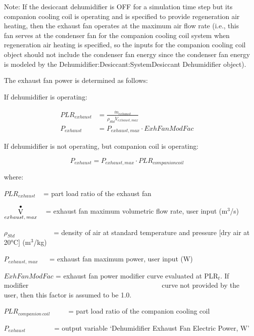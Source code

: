 Note: If the desiccant dehumidifier is OFF for a simulation time step but its companion cooling coil is operating and is specified to provide regeneration air heating, then the exhaust fan operates at the maximum air flow rate (i.e., this fan serves at the condenser fan for the companion cooling coil system when regeneration air heating is specified, so the inputs for the companion cooling coil object should not include the condenser fan energy since the condenser fan energy is modeled by the Dehumidifier:Desiccant:SystemDesiccant Dehumidifier object).

The exhaust fan power is determined as follows:

If dehumidifier is operating:

\begin{equation}
  \begin{array}{rl}
    PLR_{exhaust} &= \frac{\dot{m}_{exhaust}}{\rho_{Std}\dot{V}_{exhaust,max}} \\
    P_{exhaust} &= P_{exhaust,max} \cdot ExhFanModFac
  \end{array}
\end{equation}

If dehumidifier is not operating, but companion coil is operating:

\begin{equation}
  P_{exhaust} = P_{exhaust,max} \cdot PLR_{companion coil}
\end{equation}

where:

\(PL{R_{exhaust}}\) ~ = part load ratio of the exhaust fan

\({\mathop {\rm{V}}\limits^ \bullet_{exhaust,\,max}}\) ~ = exhaust fan maximum volumetric flow rate, user input (m\(^{3}\)/s)

\({\rho_{Std}}\) ~~~~~~~~~~ = density of air at standard temperature and pressure {[}dry air at 20°C{]} (m\(^{3}\)/kg)

\({P_{exhaust,\,max}}\) ~~ = exhaust fan maximum power, user input (W)

\(ExhFanModFac\) = exhaust fan power modifier curve evaluated at PLR\(_{t}\). If modifier~~~~~~~~~~~~~~~~~ ~~~~~~~~~~~~~ ~~~~~ ~~curve not provided by the user, then this factor is assumed to be 1.0.

\(PL{R_{companion\,coil}}\) ~~~~ = part load ratio of the companion cooling coil

\({P_{exhaust}}\) ~~~~~~~ = output variable `Dehumidifier Exhaust Fan Electric Power, W'

